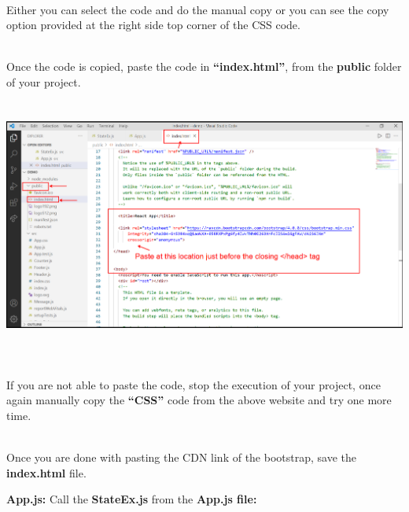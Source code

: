 \documentclass{article}
\begin{document}
\noindent 

\noindent \\
Either you can select the code and do the manual copy or you can see the copy option provided at the right side top corner of the CSS code.

\noindent 

\noindent \\
Once the code is copied, paste the code in \textbf{``index.html''}, from the \textbf{public} folder of your project.

\begin{center}
	\noindent \includegraphics*[width=6.24in, height=3.26in]{IMG-09-15}
\end{center}

\noindent 

\noindent \\
If you are not able to paste the code, stop the execution of your project, once again manually copy the \textbf{``CSS''} code from the above website and try one more time.

\noindent 

\noindent \\
Once you are done with pasting the CDN link of the bootstrap, save the \textbf{index.html} file.

\noindent 

\noindent 
\textbf{App.js: }Call the \textbf{StateEx.js} from the \textbf{App.js file:}
\end{document}
